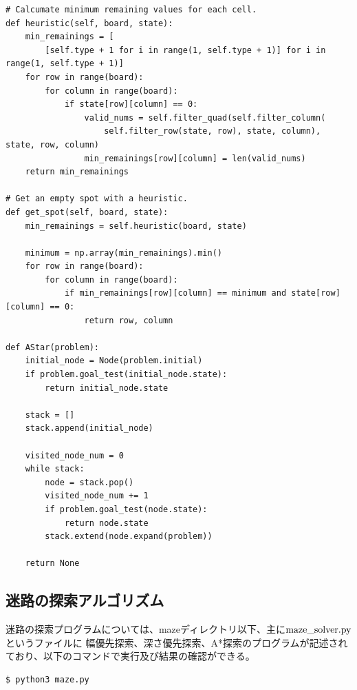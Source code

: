 \documentclass[uplatex]{jsarticle}
\begin{document}
\begin{lstlisting}[basicstyle=\ttfamily\footnotesize, frame=single]
# Calcumate minimum remaining values for each cell.
def heuristic(self, board, state):
    min_remainings = [
        [self.type + 1 for i in range(1, self.type + 1)] for i in range(1, self.type + 1)]
    for row in range(board):
        for column in range(board):
            if state[row][column] == 0:
                valid_nums = self.filter_quad(self.filter_column(
                    self.filter_row(state, row), state, column), state, row, column)
                min_remainings[row][column] = len(valid_nums)
    return min_remainings

# Get an empty spot with a heuristic.
def get_spot(self, board, state):
    min_remainings = self.heuristic(board, state)

    minimum = np.array(min_remainings).min()
    for row in range(board):
        for column in range(board):
            if min_remainings[row][column] == minimum and state[row][column] == 0:
                return row, column

def AStar(problem):
    initial_node = Node(problem.initial)
    if problem.goal_test(initial_node.state):
        return initial_node.state

    stack = []
    stack.append(initial_node)

    visited_node_num = 0
    while stack:
        node = stack.pop()
        visited_node_num += 1
        if problem.goal_test(node.state):
            return node.state
        stack.extend(node.expand(problem))

    return None

\end{lstlisting}


\subsection{迷路の探索アルゴリズム}
迷路の探索プログラムについては、mazeディレクトリ以下、主に$\rm{maze\_solver.py}$というファイルに
幅優先探索、深さ優先探索、A*探索のプログラムが記述されており、以下のコマンドで実行及び結果の確認ができる。

\begin{lstlisting}[basicstyle=\ttfamily\footnotesize, frame=single]
  $ python3 maze.py
\end{lstlisting}
\end{document}
